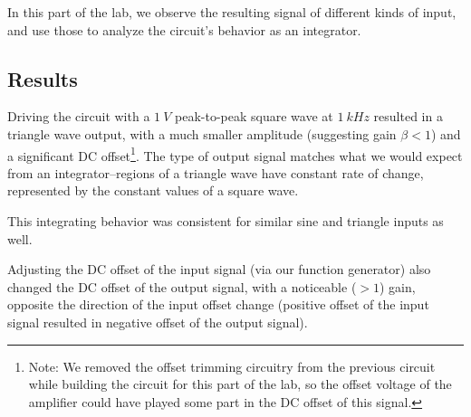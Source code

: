 \documentclass[11pt]{article}
\begin{document}
In this part of the lab, we observe the resulting signal of different kinds of input, and use those to analyze the circuit's behavior as an integrator.


\subsection{Results}

Driving the circuit with a $1\ V$ peak-to-peak square wave at $1\ kHz$ resulted in a triangle wave output, with a much smaller amplitude (suggesting gain $\beta < 1$) and a significant DC offset\footnote{Note: We removed the offset trimming circuitry from the previous circuit while building the circuit for this part of the lab, so the offset voltage of the amplifier could have played some part in the DC offset of this signal.}. The type of output signal matches what we would expect from an integrator--regions of a triangle wave have constant rate of change, represented by the constant values of a square wave.

This integrating behavior was consistent for similar sine and triangle inputs as well.

Adjusting the DC offset of the input signal (via our function generator) also changed the DC offset of the output signal, with a noticeable ($>1$) gain, opposite the direction of the input offset change (positive offset of the input signal resulted in negative offset of the output signal). 
\end{document}
